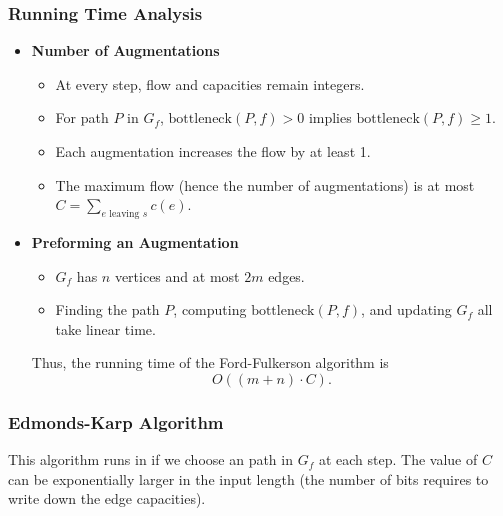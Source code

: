 \subsubsection{Running Time Analysis}
\begin{itemize}
    \item \textbf{Number of Augmentations}
    
    \begin{itemize}
        \item At every step, flow and capacities remain integers. 
        \item For path $P$ in $G_f$, $\text{bottleneck}(P, f) > 0$ implies $\text{bottleneck}(P, f) \ge 1$.
        \item Each augmentation increases the flow by at least 1.
        \item The maximum flow (hence the number of augmentations) is at most $C = \sum_{e \text{ leaving } s} c(e)$.
    \end{itemize}

    \item \textbf{Preforming an Augmentation}
    
    \begin{itemize}
        \item $G_f$ has $n$ vertices and at most $2m$ edges. 
        \item Finding the path $P$, computing $\text{bottleneck}(P, f)$, and updating $G_f$ all take linear time. 
    \end{itemize}

    Thus, the running time of the Ford-Fulkerson algorithm is \[ O((m+n) \cdot C). \]
\end{itemize}

\subsubsection{Edmonds-Karp Algorithm}

This algorithm runs in  if we choose an  path in $G_f$ at each step. The value of $C$ can be exponentially larger in the input length (the number of bits requires to write down the edge capacities). 

